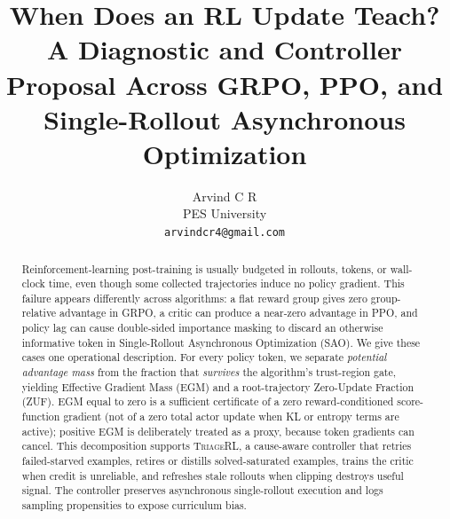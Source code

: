 \documentclass{article}
\title{When Does an RL Update Teach?\\
A Diagnostic and Controller Proposal Across GRPO, PPO, and\\
Single-Rollout Asynchronous Optimization}
\author{Arvind C R\\
PES University\\
\texttt{arvindcr4@gmail.com}}
\newcommand{\method}{\textsc{TriageRL}\xspace}
\begin{document}
\maketitle

\begin{abstract}
Reinforcement-learning post-training is usually budgeted in rollouts, tokens,
or wall-clock time, even though some collected trajectories induce no policy
gradient.  This failure appears differently across algorithms: a flat reward
group gives zero group-relative advantage in GRPO, a critic can produce a
near-zero advantage in PPO, and policy lag can cause double-sided importance
masking to discard an otherwise informative token in Single-Rollout
Asynchronous Optimization (SAO).  We give these cases one operational
description.  For every policy token, we separate \emph{potential advantage
mass} from the fraction that \emph{survives} the algorithm's trust-region
gate, yielding Effective Gradient Mass (EGM) and a root-trajectory
Zero-Update Fraction (ZUF).  EGM equal to zero is a sufficient certificate of
a zero reward-conditioned score-function gradient (not of a zero total
actor update when KL or entropy terms are active); positive EGM is deliberately treated as
a proxy, because token gradients can cancel.  This decomposition supports
\method, a cause-aware controller that retries failed-starved examples,
retires or distills solved-saturated examples, trains the critic when credit is
unreliable, and refreshes stale rollouts when clipping destroys useful signal.
The controller preserves asynchronous single-rollout execution and logs
sampling propensities to expose curriculum bias.


\end{abstract}
\end{document}
